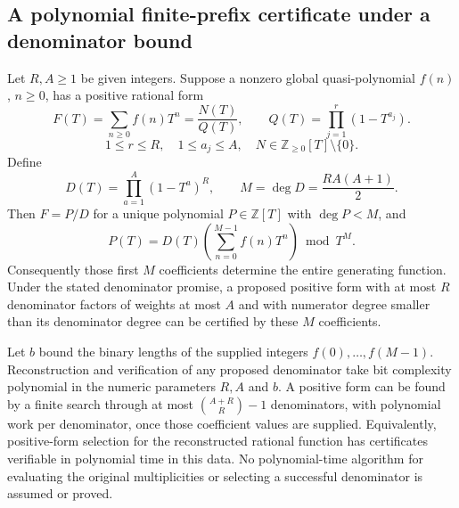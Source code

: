 \subsection{A polynomial finite-prefix certificate under a denominator bound}

\begin{proposition}
\label{prop:finiteprefix}
Let $R,A\ge1$ be given integers. Suppose a nonzero global
quasi-polynomial $f(n)$, $n\ge0$, has a positive rational form
\[
 F(T)=\sum_{n\ge0}f(n)T^n
 =\frac{N(T)}{Q(T)},\qquad
 Q(T)=\prod_{j=1}^{r}(1-T^{a_j}).
\]
\[
 1\le r\le R,\quad 1\le a_j\le A,
 \quad N\in\mathbb Z_{\ge0}[T]\setminus\{0\}.
\]
Define
\[
 D(T)=\prod_{a=1}^{A}(1-T^a)^R,
 \qquad M=\deg D=\frac{RA(A+1)}2.
\]
Then $F=P/D$ for a unique polynomial $P\in\mathbb Z[T]$ with
$\deg P<M$, and
\[
 P(T)=D(T)\left(\sum_{n=0}^{M-1}f(n)T^n\right)\bmod T^M.
 \tag{P-F13a}
\]
Consequently those first $M$ coefficients determine the entire
generating function. Under the stated denominator promise, a proposed
positive form with at most $R$ denominator factors of weights at most
$A$ and with numerator degree smaller than its denominator degree can
be certified by these $M$ coefficients.

Let $b$ bound the binary lengths of the supplied integers
$f(0),\ldots,f(M-1)$. Reconstruction and verification of any proposed
denominator take bit complexity polynomial in the numeric parameters
$R,A$ and $b$. A positive form can be found by a finite search through
at most $\binom{A+R}{R}-1$ denominators, with polynomial work per
denominator, once those coefficient values are supplied.
Equivalently, positive-form selection for the reconstructed rational
function has certificates verifiable in polynomial time in this data.
No polynomial-time algorithm for evaluating the original multiplicities
or selecting a successful denominator is assumed or proved.
\end{proposition}

